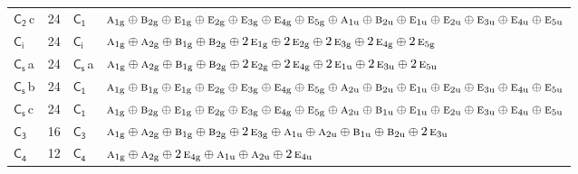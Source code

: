 \documentclass[10pt,a4paper]{article}
\numberwithin{equation}{section}
\newcommand{\grp}[1]{\mathsf{#1}}
\newcommand{\irr}[1]{\text{\normalfont\scshape #1}}
\newcommand{\ptag}[1]{\mathrm{#1}}
\newcommand{\clsletter}[1]{\,{\scriptsize\color{black!55}#1}}
\newlength{\fillwidth}\newlength{\cellwidth}\newlength{\colwidth}
\begin{document}
{\begin{longtable}{@{}lrl>{\RaggedRight\arraybackslash}p{\fillwidth}@{}}
\href{C2.pdf}{$\grp{C_{2}}$}\clsletter{c} & 24 & \href{C1.pdf}{$\grp{C_{1}}$} & $\irr{a}_{1\ptag{g}}\oplus \irr{b}_{2\ptag{g}}\oplus \irr{e}_{1\ptag{g}}\oplus \irr{e}_{2\ptag{g}}\oplus \irr{e}_{3\ptag{g}}\oplus \irr{e}_{4\ptag{g}}\oplus \irr{e}_{5\ptag{g}}\oplus \irr{a}_{1\ptag{u}}\oplus \irr{b}_{2\ptag{u}}\oplus \irr{e}_{1\ptag{u}}\oplus \irr{e}_{2\ptag{u}}\oplus \irr{e}_{3\ptag{u}}\oplus \irr{e}_{4\ptag{u}}\oplus \irr{e}_{5\ptag{u}}$\\
\href{S2.pdf}{$\grp{C_{i}}$} & 24 & \href{S2.pdf}{$\grp{C_{i}}$} & $\irr{a}_{1\ptag{g}}\oplus \irr{a}_{2\ptag{g}}\oplus \irr{b}_{1\ptag{g}}\oplus \irr{b}_{2\ptag{g}}\oplus 2\,\irr{e}_{1\ptag{g}}\oplus 2\,\irr{e}_{2\ptag{g}}\oplus 2\,\irr{e}_{3\ptag{g}}\oplus 2\,\irr{e}_{4\ptag{g}}\oplus 2\,\irr{e}_{5\ptag{g}}$\\
\href{C1v.pdf}{$\grp{C_{s}}$}\clsletter{a} & 24 & \href{C1v.pdf}{$\grp{C_{s}}$}\clsletter{a} & $\irr{a}_{1\ptag{g}}\oplus \irr{a}_{2\ptag{g}}\oplus \irr{b}_{1\ptag{g}}\oplus \irr{b}_{2\ptag{g}}\oplus 2\,\irr{e}_{2\ptag{g}}\oplus 2\,\irr{e}_{4\ptag{g}}\oplus 2\,\irr{e}_{1\ptag{u}}\oplus 2\,\irr{e}_{3\ptag{u}}\oplus 2\,\irr{e}_{5\ptag{u}}$\\
\href{C1v.pdf}{$\grp{C_{s}}$}\clsletter{b} & 24 & \href{C1.pdf}{$\grp{C_{1}}$} & $\irr{a}_{1\ptag{g}}\oplus \irr{b}_{1\ptag{g}}\oplus \irr{e}_{1\ptag{g}}\oplus \irr{e}_{2\ptag{g}}\oplus \irr{e}_{3\ptag{g}}\oplus \irr{e}_{4\ptag{g}}\oplus \irr{e}_{5\ptag{g}}\oplus \irr{a}_{2\ptag{u}}\oplus \irr{b}_{2\ptag{u}}\oplus \irr{e}_{1\ptag{u}}\oplus \irr{e}_{2\ptag{u}}\oplus \irr{e}_{3\ptag{u}}\oplus \irr{e}_{4\ptag{u}}\oplus \irr{e}_{5\ptag{u}}$\\
\href{C1v.pdf}{$\grp{C_{s}}$}\clsletter{c} & 24 & \href{C1.pdf}{$\grp{C_{1}}$} & $\irr{a}_{1\ptag{g}}\oplus \irr{b}_{2\ptag{g}}\oplus \irr{e}_{1\ptag{g}}\oplus \irr{e}_{2\ptag{g}}\oplus \irr{e}_{3\ptag{g}}\oplus \irr{e}_{4\ptag{g}}\oplus \irr{e}_{5\ptag{g}}\oplus \irr{a}_{2\ptag{u}}\oplus \irr{b}_{1\ptag{u}}\oplus \irr{e}_{1\ptag{u}}\oplus \irr{e}_{2\ptag{u}}\oplus \irr{e}_{3\ptag{u}}\oplus \irr{e}_{4\ptag{u}}\oplus \irr{e}_{5\ptag{u}}$\\
\href{C3.pdf}{$\grp{C_{3}}$} & 16 & \href{C3.pdf}{$\grp{C_{3}}$} & $\irr{a}_{1\ptag{g}}\oplus \irr{a}_{2\ptag{g}}\oplus \irr{b}_{1\ptag{g}}\oplus \irr{b}_{2\ptag{g}}\oplus 2\,\irr{e}_{3\ptag{g}}\oplus \irr{a}_{1\ptag{u}}\oplus \irr{a}_{2\ptag{u}}\oplus \irr{b}_{1\ptag{u}}\oplus \irr{b}_{2\ptag{u}}\oplus 2\,\irr{e}_{3\ptag{u}}$\\
\href{C4.pdf}{$\grp{C_{4}}$} & 12 & \href{C4.pdf}{$\grp{C_{4}}$} & $\irr{a}_{1\ptag{g}}\oplus \irr{a}_{2\ptag{g}}\oplus 2\,\irr{e}_{4\ptag{g}}\oplus \irr{a}_{1\ptag{u}}\oplus \irr{a}_{2\ptag{u}}\oplus 2\,\irr{e}_{4\ptag{u}}$\\

\end{longtable}}
\end{document}
